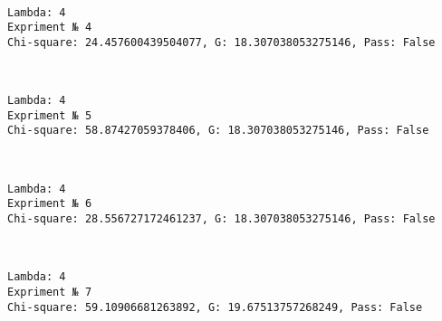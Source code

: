 \documentclass[11pt]{article}
\begin{document}
    \begin{center}
    \end{center}
    { \hspace*{\fill} \\}
    
    \begin{Verbatim}[commandchars=\\\{\}]
Lambda: 4
Expriment № 4
Chi-square: 24.457600439504077, G: 18.307038053275146, Pass: False
    \end{Verbatim}

    \begin{center}
    \end{center}
    { \hspace*{\fill} \\}
    
    \begin{Verbatim}[commandchars=\\\{\}]
Lambda: 4
Expriment № 5
Chi-square: 58.87427059378406, G: 18.307038053275146, Pass: False
    \end{Verbatim}

    \begin{center}
    \end{center}
    { \hspace*{\fill} \\}
    
    \begin{Verbatim}[commandchars=\\\{\}]
Lambda: 4
Expriment № 6
Chi-square: 28.556727172461237, G: 18.307038053275146, Pass: False
    \end{Verbatim}

    \begin{center}
    \end{center}
    { \hspace*{\fill} \\}
    
    \begin{Verbatim}[commandchars=\\\{\}]
Lambda: 4
Expriment № 7
Chi-square: 59.10906681263892, G: 19.67513757268249, Pass: False
    \end{Verbatim}
\end{document}

